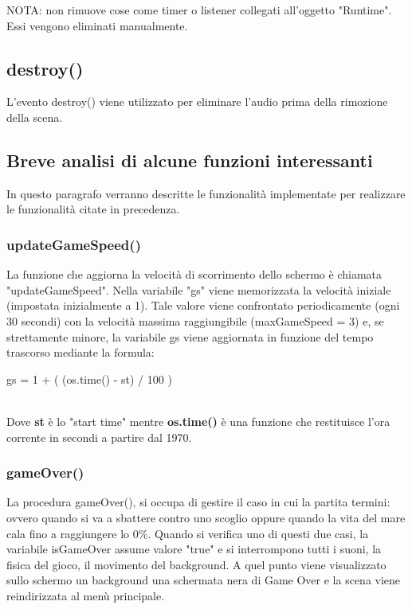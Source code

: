 \documentclass[12pt]{article}
\begin{document}
NOTA: non rimuove cose come timer o listener collegati all'oggetto "Runtime". Essi vengono eliminati manualmente.

\subsection{destroy()}
L'evento destroy() viene utilizzato per eliminare l'audio prima della rimozione della scena.

\subsection{Breve analisi di alcune funzioni interessanti}
In questo paragrafo verranno descritte le funzionalità implementate per realizzare le funzionalità citate in precedenza.
\subsubsection{updateGameSpeed()}
La funzione che aggiorna la velocità di scorrimento dello schermo è chiamata "updateGameSpeed". Nella variabile "gs" viene memorizzata la velocità iniziale (impostata inizialmente a 1). Tale valore viene confrontato periodicamente (ogni 30 secondi) con la velocità massima raggiungibile (maxGameSpeed = 3) e, se strettamente minore, la variabile gs viene aggiornata in funzione del tempo trascorso mediante la formula:\\

\begin{center}
    gs = 1 + ( (os.time() - st) / 100 )
\end{center}

\\

Dove \textbf{st} è lo "start time" mentre \textbf{os.time()} è una funzione che restituisce l'ora corrente in secondi a partire dal 1970.

\subsubsection{gameOver()}
La procedura gameOver(), si occupa di gestire il caso in cui la partita termini: ovvero quando si va a sbattere contro uno scoglio oppure quando la vita del mare cala fino a raggiungere lo 0\%. Quando si verifica uno di questi due casi, la variabile isGameOver assume valore "true" e si interrompono tutti i suoni, la fisica del gioco, il movimento del background. A quel punto viene visualizzato sullo schermo un background una schermata nera di Game Over e la scena viene reindirizzata al menù principale.
\end{document}

